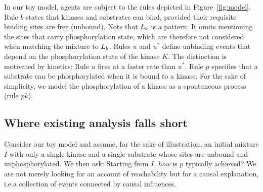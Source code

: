 \longversion{}

In our toy model, agents are subject to the rules depicted in Figure~\ref{fig:model}. Rule $b$ states that kinases and substrates can bind, provided their requisite binding sites are free (unbound). Note that $L_{b}$ is a pattern: It omits mentioning the sites that carry phosphorylation state, which are therefore not considered when matching the mixture to $L_{b}$. Rules $u$ and $u^{*}$ define unbinding events that depend
on the phosphorylation state of the kinase $K$. The distinction is motivated by
kinetics: Rule $u$ fires at a faster rate than $u^{*}$. Rule $p$ specifies that
a substrate can be phosphorylated when it is bound to a kinase. For the sake of
simplicity, we model the phosphorylation of a kinase as a spontaneous process (rule $pk$).

\subsection{Where existing analysis falls short}
\label{subsec:dumb-story}


Consider our toy model and assume, for the
sake of illustration, an initial mixture $I$ with only a single kinase
and a single substrate whose sites are unbound and
unphosphorylated. We then ask: Starting from $I$, \emph{how} is $p$ typically achieved? We are not merely looking for an account of
reachability but for a causal explanation, i.e.\@ a collection of events connected by causal influences.

